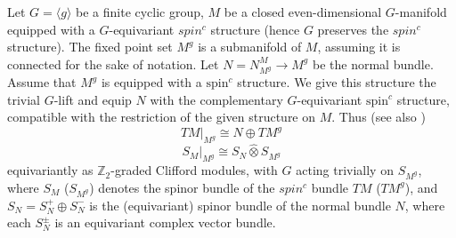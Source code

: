 \documentclass[11pt,leqno,twoside]{amsart}
\theoremstyle{plainsl}
\theoremstyle{definition}
\begin{document}
Let $G=\langle g\rangle$ be a finite cyclic group, $M$ be a closed even-dimensional $G$-manifold equipped with a $G$-equivariant $spin^c$ structure (hence $G$ preserves the $spin^c$ structure). The fixed point set $M^g$ is a submanifold of $M$, assuming it is connected for the sake of notation. 
Let $N=N^M_{M^g}\to M^g$ be the normal bundle.
Assume that $M^g$ is equipped with a $\mathrm{spin}^c$
structure. We give this structure the trivial $G$-lift
and equip $N$ with the complementary $G$-equivariant
$\mathrm{spin}^c$ structure, compatible with the
restriction of the given structure on $M$. Thus (see also \cite[4.4]{BHS})
\begin{equation}\label{spincompatibilty2}
    TM|_{M^g}\cong N\oplus TM^g
\end{equation}
\begin{equation}\label{spincompatibilty}
S_M|_{M^g}\cong S_N\widehat\otimes S_{M^g}
\end{equation}
equivariantly as $\mathbb{Z}_2$-graded Clifford modules,  with $G$ acting trivially on $S_{M^g}$, where $S_M$ ($S_{M^g}$) denotes the spinor bundle of the $spin^c$ bundle $TM$ ($TM^g$), and $S_N=S^{+}_N\oplus S^{-}_N$ is the (equivariant) spinor bundle of the normal bundle $N$, where each $S^{\pm}_N$ is an equivariant complex vector bundle.
\end{document}
